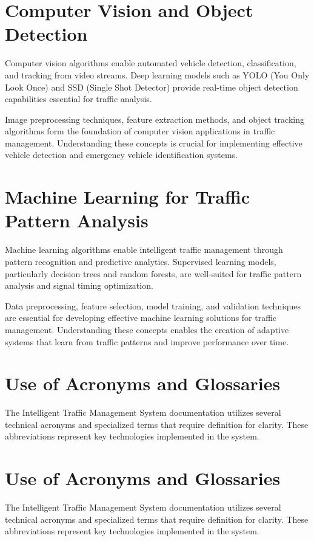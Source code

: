 \documentclass[12pt]{report}
\begin{document}
\section{Computer Vision and Object Detection}

Computer vision algorithms enable automated vehicle detection, classification, and tracking from video streams. Deep learning models such as YOLO (You Only Look Once) and SSD (Single Shot Detector) provide real-time object detection capabilities essential for traffic analysis.

Image preprocessing techniques, feature extraction methods, and object tracking algorithms form the foundation of computer vision applications in traffic management. Understanding these concepts is crucial for implementing effective vehicle detection and emergency vehicle identification systems.

\section{Machine Learning for Traffic Pattern Analysis}

Machine learning algorithms enable intelligent traffic management through pattern recognition and predictive analytics. Supervised learning models, particularly decision trees and random forests, are well-suited for traffic pattern analysis and signal timing optimization.

Data preprocessing, feature selection, model training, and validation techniques are essential for developing effective machine learning solutions for traffic management. Understanding these concepts enables the creation of adaptive systems that learn from traffic patterns and improve performance over time.

\section{Use of Acronyms and Glossaries}
The Intelligent Traffic Management System documentation utilizes several technical acronyms and specialized terms that require definition for clarity. These abbreviations represent key technologies implemented in the system.
\section{Use of Acronyms and Glossaries}
The Intelligent Traffic Management System documentation utilizes several technical acronyms and specialized terms that require definition for clarity. These abbreviations represent key technologies implemented in the system.
\end{document}
